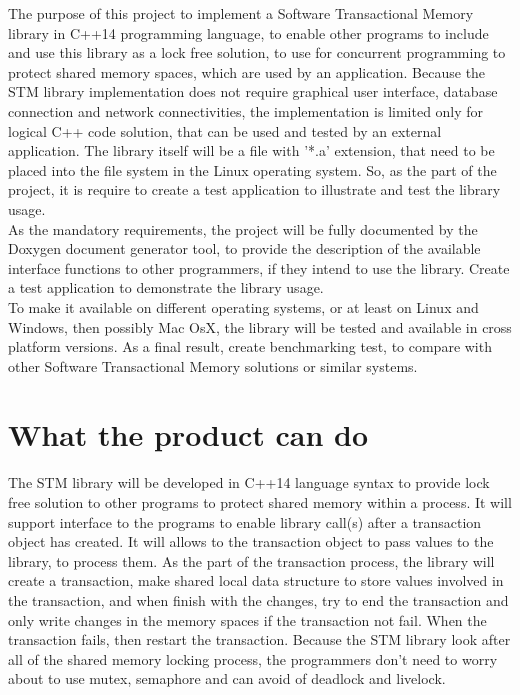 \documentclass[12pt]{article}
\begin{document}
The purpose of this project to implement a Software Transactional Memory library in C++14 programming language, to enable other programs to include and use this library as a lock free solution, to use for concurrent programming to protect shared memory spaces, which are used by an application. Because the STM library implementation does not require graphical user interface, database connection and network connectivities, the implementation is limited only for logical C++ code solution, that can be used and tested by an external application. The library itself will be a file with '*.a' extension, that need to be placed into the file system in the Linux operating system. So, as the part of the project, it is require to create a test application to illustrate and test the library usage.\\

As the mandatory requirements, the project will be fully documented by the Doxygen document generator tool, to provide the description of the available interface functions to other programmers, if they intend to use the library. Create a test application to demonstrate the library usage.\\

To make it available on different operating systems, or at least on Linux and Windows, then possibly Mac OsX, the library will be tested and available in cross platform versions. As a final result, create benchmarking test, to compare with other Software Transactional Memory solutions or similar systems.

\clearpage
\section{What the product can do}
The STM library will be developed in C++14 language syntax to provide lock free solution to other programs to protect shared memory within a process. It will support interface to the programs to enable library call(s) after a transaction object has created. It will allows to the transaction object to pass values to  the library, to process them. As the part of the transaction process, the library will create a transaction, make shared local data structure to store values involved in the transaction, and when finish with the changes, try to end the transaction and only write changes in the memory spaces if the transaction not fail. When the transaction fails, then restart the transaction. Because the STM library look after all of the shared memory locking process, the programmers don't need to worry about to use mutex, semaphore and can avoid of deadlock and livelock.
\end{document}
